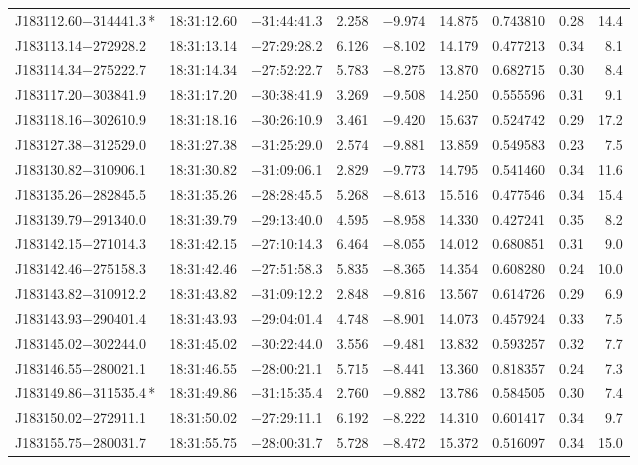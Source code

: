 \begin{table*}
\begin{tabular}{lcccccccr}
J183112.60$-$314441.3\,* & 18:31:12.60 & $-$31:44:41.3 &  2.258 & $-$9.974 & 14.875 & 0.743810 & 0.28 & 14.4 \\
J183113.14$-$272928.2 & 18:31:13.14 & $-$27:29:28.2 &  6.126 & $-$8.102 & 14.179 & 0.477213 & 0.34 & 8.1 \\
J183114.34$-$275222.7 & 18:31:14.34 & $-$27:52:22.7 &  5.783 & $-$8.275 & 13.870 & 0.682715 & 0.30 & 8.4 \\
J183117.20$-$303841.9 & 18:31:17.20 & $-$30:38:41.9 &  3.269 & $-$9.508 & 14.250 & 0.555596 & 0.31 & 9.1 \\
J183118.16$-$302610.9 & 18:31:18.16 & $-$30:26:10.9 &  3.461 & $-$9.420 & 15.637 & 0.524742 & 0.29 & 17.2 \\
J183127.38$-$312529.0 & 18:31:27.38 & $-$31:25:29.0 &  2.574 & $-$9.881 & 13.859 & 0.549583 & 0.23 & 7.5 \\
J183130.82$-$310906.1 & 18:31:30.82 & $-$31:09:06.1 &  2.829 & $-$9.773 & 14.795 & 0.541460 & 0.34 & 11.6 \\
J183135.26$-$282845.5 & 18:31:35.26 & $-$28:28:45.5 &  5.268 & $-$8.613 & 15.516 & 0.477546 & 0.34 & 15.4 \\
J183139.79$-$291340.0 & 18:31:39.79 & $-$29:13:40.0 &  4.595 & $-$8.958 & 14.330 & 0.427241 & 0.35 & 8.2 \\
J183142.15$-$271014.3 & 18:31:42.15 & $-$27:10:14.3 &  6.464 & $-$8.055 & 14.012 & 0.680851 & 0.31 & 9.0 \\
J183142.46$-$275158.3 & 18:31:42.46 & $-$27:51:58.3 &  5.835 & $-$8.365 & 14.354 & 0.608280 & 0.24 & 10.0 \\
J183143.82$-$310912.2 & 18:31:43.82 & $-$31:09:12.2 &  2.848 & $-$9.816 & 13.567 & 0.614726 & 0.29 & 6.9 \\
J183143.93$-$290401.4 & 18:31:43.93 & $-$29:04:01.4 &  4.748 & $-$8.901 & 14.073 & 0.457924 & 0.33 & 7.5 \\
J183145.02$-$302244.0 & 18:31:45.02 & $-$30:22:44.0 &  3.556 & $-$9.481 & 13.832 & 0.593257 & 0.32 & 7.7 \\
J183146.55$-$280021.1 & 18:31:46.55 & $-$28:00:21.1 &  5.715 & $-$8.441 & 13.360 & 0.818357 & 0.24 & 7.3 \\
J183149.86$-$311535.4\,* & 18:31:49.86 & $-$31:15:35.4 &  2.760 & $-$9.882 & 13.786 & 0.584505 & 0.30 & 7.4 \\
J183150.02$-$272911.1 & 18:31:50.02 & $-$27:29:11.1 &  6.192 & $-$8.222 & 14.310 & 0.601417 & 0.34 & 9.7 \\
J183155.75$-$280031.7 & 18:31:55.75 & $-$28:00:31.7 &  5.728 & $-$8.472 & 15.372 & 0.516097 & 0.34 & 15.0 \\

\end{tabular}
\end{table*}
